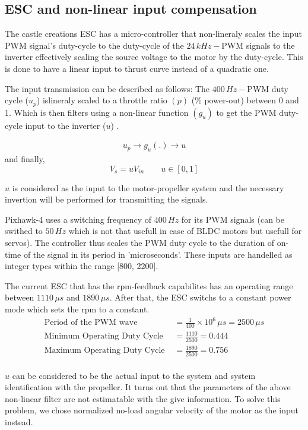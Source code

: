 \subsection{ESC and non-linear input compensation}

The castle creations ESC has a micro-controller that non-lineraly scales the input PWM signal's duty-cycle to the duty-cycle of the $24\,kHz -$PWM signals to the inverter effectively scaling the source voltage to the motor by the duty-cycle. This is done to have a linear input to thrust curve instead of a quadratic one.

The input transmission can be described as follows: The $400\,Hz-$PWM duty cycle ($u_p$) islineraly scaled to a throttle ratio $(p)$ ($\%$ power-out) between 0 and 1. Which is then filters using a non-linear function $(g_u)$ to get the PWM duty-cycle input to the inverter ($u$) \cite{kim2017electric}.

\begin{align*}
    u_p \rightarrow \boxed{g_u(.)} \rightarrow u
\end{align*}
and finally,
$$V_s = u V_{in} \qquad u \in [0, 1]$$

$u$ is considered as the input to the motor-propeller system and the necessary invertion will be performed for transmitting the signals.

Pixhawk-4 uses a switching frequency of $400\,Hz$ for its PWM signals (can be swithed to $50 \, Hz$ which is not that usefull in case of BLDC motors but usefull for servos). The controller thus scales the PWM duty cycle to the duration of on-time of the signal in its period in 'microseconds'. These inputs are handelled as integer types within the range [800, 2200]\cite{px4_pwm}.

The current ESC that has the rpm-feedback capabilites has an operating range between $1110 \, \mu s$ and $1890 \, \mu s$. After that, the ESC switchs to a constant power mode which sets the rpm to a constant.
\begin{align*}
    \text{Period of the PWM wave } &= \frac{1}{400} \times 10^6 \, \mu s = 2500 \, \mu s\\
    \text{Minimum Operating Duty Cycle } &= \frac{1110}{2500} = 0.444\\
    \text{Maximum Operating Duty Cycle } &= \frac{1890}{2500} = 0.756\\
\end{align*}

$u$ can be considered to be the actual input to the system and system identification with the propeller. It turns out that the parameters of the above non-linear filter are not estimatable with the give information. To solve this problem, we chose normalized no-load angular velocity of the motor as the input instead.
